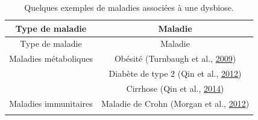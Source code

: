 \documentclass[12pt,a4paper]{reedthesis}
\theoremstyle{definition}
\theoremstyle{definition}
\theoremstyle{definition}
\theoremstyle{remark}
\begin{document}
\newpage
\begin{longtable}[]{@{}cc@{}}
\caption{\label{tab:dysbioses} Quelques exemples de maladies associées à une dysbiose.}\tabularnewline
\toprule
\begin{minipage}[b]{0.31\columnwidth}\centering
Type de maladie\strut
\end{minipage} & \begin{minipage}[b]{0.63\columnwidth}\centering
Maladie\strut
\end{minipage}\tabularnewline
\midrule
\endfirsthead
\toprule
\begin{minipage}[b]{0.31\columnwidth}\centering
Type de maladie\strut
\end{minipage} & \begin{minipage}[b]{0.63\columnwidth}\centering
Maladie\strut
\end{minipage}\tabularnewline
\midrule
\endhead
\begin{minipage}[t]{0.31\columnwidth}\centering
Maladies métaboliques\strut
\end{minipage} & \begin{minipage}[t]{0.63\columnwidth}\centering
Obésité (Turnbaugh et al., \protect\hyperlink{ref-turnbaugh2009core}{2009})\strut
\end{minipage}\tabularnewline
\begin{minipage}[t]{0.31\columnwidth}\centering
\strut
\end{minipage} & \begin{minipage}[t]{0.63\columnwidth}\centering
Diabète de type 2 (Qin et al., \protect\hyperlink{ref-qin2012metagenome}{2012})\strut
\end{minipage}\tabularnewline
\begin{minipage}[t]{0.31\columnwidth}\centering
\strut
\end{minipage} & \begin{minipage}[t]{0.63\columnwidth}\centering
Cirrhose (Qin et al., \protect\hyperlink{ref-qin2014alterations}{2014})\strut
\end{minipage}\tabularnewline
\begin{minipage}[t]{0.31\columnwidth}\centering
Maladies immunitaires\strut
\end{minipage} & \begin{minipage}[t]{0.63\columnwidth}\centering
Maladie de Crohn (Morgan et al., \protect\hyperlink{ref-morgan2012dysfunction}{2012})\strut
\end{minipage}\tabularnewline
\begin{minipage}[t]{0.31\columnwidth}\centering

\end{minipage}
\end{longtable}
\end{document}

